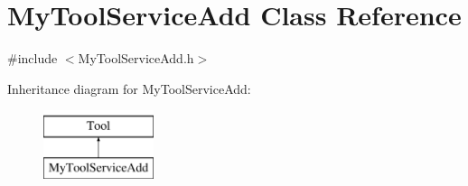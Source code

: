 \hypertarget{classMyToolServiceAdd}{\section{My\-Tool\-Service\-Add Class Reference}
\label{classMyToolServiceAdd}
}


{\ttfamily \#include $<$My\-Tool\-Service\-Add.\-h$>$}

Inheritance diagram for My\-Tool\-Service\-Add\-:\begin{figure}[H]
\begin{center}
\leavevmode
\includegraphics[height=2.000000cm]{classMyToolServiceAdd}
\end{center}
\end{figure}
